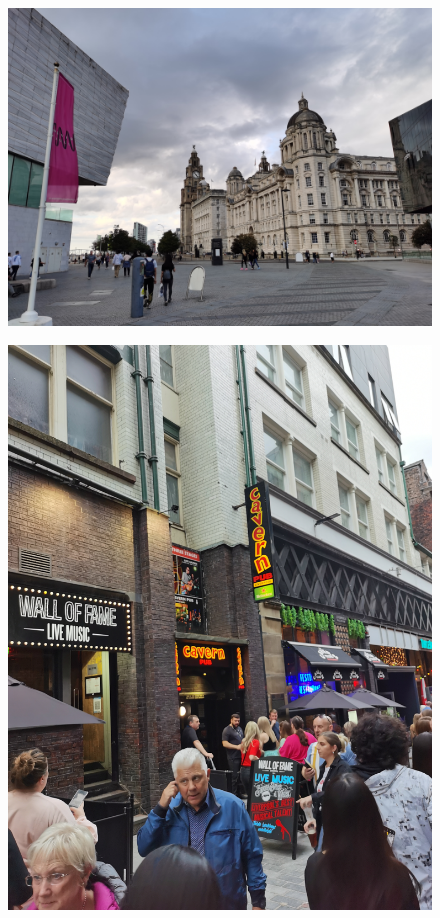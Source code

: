 \documentclass[11pt]{article}
\begin{document}
\begin{figure}[H]
    \centering
    \includegraphics[width=\textwidth]{1V.jpg}
\end{figure}

\begin{figure}[H]
    \centering
    \includegraphics[width=\textwidth]{1W.jpg}
\end{figure}
\end{document}
